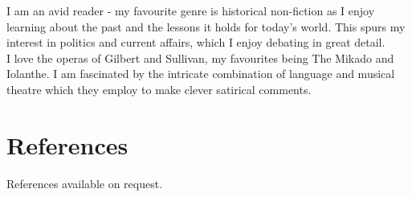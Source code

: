 \documentclass[]{friggeri-cv}
\begin{document}
I am an avid reader - my favourite genre is historical non-fiction as I enjoy learning about the past and the lessons it holds for today's world. This spurs my interest in politics and current affairs, which I enjoy debating in great detail. \\

I love the operas of Gilbert and Sullivan, my favourites being The Mikado and Iolanthe. I am fascinated by the intricate combination of language and musical theatre which they employ to make clever satirical comments.\\





\section{References}
References available on request.

\end{document}
